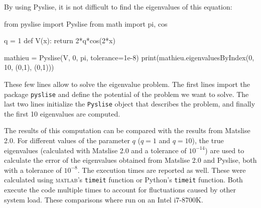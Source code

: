By using Pyslise, it is not difficult to find the eigenvalues of this
equation:

\begin{python}
  from pyslise import Pyslise
  from math import pi, cos
  
  q = 1
  def V(x):
    return 2*q*cos(2*x)
  
  mathieu = Pyslise(V, 0, pi, tolerance=1e-8)
  print(mathieu.eigenvaluesByIndex(0, 10, (0,1), (0,1)))
\end{python}

These few lines allow to solve the eigenvalue problem. The first
lines import the package \texttt{pyslise} and define the potential of the problem we want to
solve. The last two lines initialize the \texttt{Pyslise} object that
describes the problem, and finally the first 10 eigenvalues are
computed.

The results of this computation can be compared with the results from
Matslise 2.0. For different values of the parameter \(q\) (\(q = 1\) and
\(q = 10\)), the true eigenvalues (calculated with Matslise 2.0 and a
tolerance of \(10^{-14}\)) are used to calculate the error of the
eigenvalues obtained from Matslise 2.0 and Pyslise, both with a
tolerance of \(10^{-8}\). The execution times are reported as well.
These were calculated using \textsc{matlab}'s \texttt{timeit} function or Python's \texttt{timeit} function. Both execute the code multiple times to account for fluctuations caused by other system load. These comparisons where run on an Intel i7-8700K.

